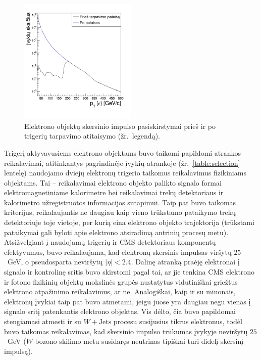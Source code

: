 \documentclass[a4paper, 12pt, oneside]{article}
\newcommand{\WJets}{W\! +\!\mathrm{Jets}}
\begin{document}
\begin{figure}[b!]
	\includegraphics[width=0.5\textwidth]{Magistrinis/prescale.png}
	\vspace{-1.2cm}
	\caption{\label{fig:prescale} Elektrono objektų skersinio impulso pasiskirstymai prieš ir po trigerių tarpavimo
	atitaisymo (žr.\ legendą).}
\end{figure}

Trigerį aktyvavusiems elektrono objektams buvo taikomi papildomi atrankos reikalavimai, atitinkantys pagrindinėje įvykių
atrankoje (žr.\ \ref{table:selection} lentelę) naudojamo dviejų elektronų trigerio taikomus reikalavimus fizikiniams objektams.
Tai -- reikalavimai elektrono objekto palikto signalo formai elektromagnetiniame kalorimetre bei reikalavimai
trekų detektoriaus ir kalorimetro užregistruotos informacijos sutapimui.
Taip pat buvo taikomas kriterijus, reikalaujantis ne daugiau kaip vieno trūkstamo pataikymo trekų detektoriuje toje vietoje, per
kurią eina elektrono objekto trajektorija (trūkstami pataikymai gali byloti apie elektrono atsiradimą antrinių procesų metu).
Atsižvelgiant į naudojamų trigerių ir CMS detektoriaus komponentų efektyvumus, buvo reikalaujama, kad elektronų skersinis
impulsas viršytų $25$~GeV, o pseudosparta neviršytų $|\eta|<2.4$.
Dalinę atranką praėję elektronai į signalo ir kontrolinę sritis buvo skirstomi pagal tai, ar jie tenkina CMS elektrono
ir fotono fizikinių objektų mokslinės grupės nustatytus vidutiniškai griežtus elektrono atpažinimo reikalavimus, ar ne.
Analogiškai, kaip ir su miuonais, elektronų įvykiai taip pat buvo atmetami, jeigu juose yra daugiau negu vienas į signalo
sritį patenkantis elektrono objektas.
Vis dėlto, čia buvo papildomai stengiamasi atmesti ir su $\WJets$ procesu susijusius tikrus elektronus, todėl buvo taikomas
reikalavimas, kad skersinio impulso trūkumas įvykyje neviršytų $25$~GeV ($W$ bozono skilimo metu susidaręs neutrinas tipiškai
turi didelį skersinį impulsą).
\end{document}
